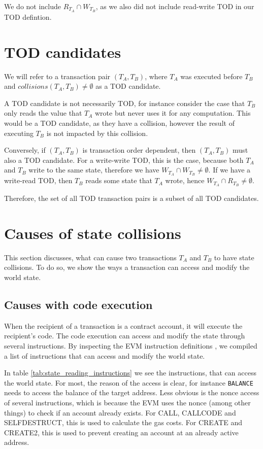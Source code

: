 \documentclass[draft,final]{vutinfth} %
\begin{document}
We do not include $R_{T_A} \cap W_{T_B}$, as we also did not include read-write TOD in our TOD defintion.

\section{TOD candidates}

We will refer to a transaction pair $(T_A, T_B)$, where $T_A$ was executed before $T_B$ and $collisions(T_A, T_B) \neq \emptyset$ as a TOD candidate.

A TOD candidate is not necessarily TOD, for instance consider the case that $T_B$ only reads the value that $T_A$ wrote but never uses it for any computation. This would be a TOD candidate, as they have a collision, however the result of executing $T_B$ is not impacted by this collision.

Conversely, if $(T_A, T_B)$ is transaction order dependent, then $(T_A, T_B)$ must also a TOD candidate. For a write-write TOD, this is the case, because both $T_A$ and $T_B$ write to the same state, therefore we have $W_{T_A} \cap W_{T_B} \neq \emptyset$. If we have a write-read TOD, then $T_B$ reads some state that $T_A$ wrote, hence $W_{T_A} \cap R_{T_B} \neq \emptyset$.

Therefore, the set of all TOD transaction pairs is a subset of all TOD candidates.

\section{Causes of state collisions}

This section discusses, what can cause two transactions $T_A$ and $T_B$ to have state collisions. To do so, we show the ways a transaction can access and modify the world state.

\subsection{Causes with code execution}

When the recipient of a transaction is a contract account, it will execute the recipient's code. The code execution can access and modify the state through several instructions. By inspecting the EVM instruction definitions \cite[p.30-38]{wood_ethereum_2024}\cite{noauthor_evm_2024}, we compiled a list of instructions that can access and modify the world state.

In table \ref{tab:state_reading_instructions} we see the instructions, that can access the world state. For most, the reason of the access is clear, for instance \verb|BALANCE| needs to access the balance of the target address. Less obvious is the nonce access of several instructions, which is because the EVM uses the nonce (among other things) to check if an account already exists. For CALL, CALLCODE and SELFDESTRUCT, this is used to calculate the gas costs. For CREATE and CREATE2, this is used to prevent creating an account at an already active address. \cite{wood_ethereum_2024}
\end{document}

